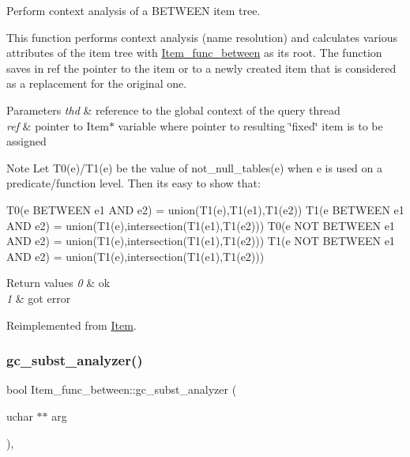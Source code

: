 Perform context analysis of a B\+E\+T\+W\+E\+EN item tree.

This function performs context analysis (name resolution) and calculates various attributes of the item tree with \mbox{\hyperlink{classItem__func__between}{Item\+\_\+func\+\_\+between}} as its root. The function saves in ref the pointer to the item or to a newly created item that is considered as a replacement for the original one.


\begin{DoxyParams}{Parameters}
{\em thd} & reference to the global context of the query thread \\
\hline
{\em ref} & pointer to Item$\ast$ variable where pointer to resulting \char`\"{}fixed\char`\"{} item is to be assigned\\
\hline
\end{DoxyParams}
\begin{DoxyNote}{Note}
Let T0(e)/T1(e) be the value of not\+\_\+null\+\_\+tables(e) when e is used on a predicate/function level. Then it\textquotesingle{}s easy to show that\+: \begin{DoxyVerb}    T0(e BETWEEN e1 AND e2)     = union(T1(e),T1(e1),T1(e2))
    T1(e BETWEEN e1 AND e2)     = union(T1(e),intersection(T1(e1),T1(e2)))
    T0(e NOT BETWEEN e1 AND e2) = union(T1(e),intersection(T1(e1),T1(e2)))
    T1(e NOT BETWEEN e1 AND e2) = union(T1(e),intersection(T1(e1),T1(e2)))\end{DoxyVerb}

\end{DoxyNote}

\begin{DoxyRetVals}{Return values}
{\em 0} & ok \\
\hline
{\em 1} & got error \\
\hline
\end{DoxyRetVals}


Reimplemented from \mbox{\hyperlink{classItem}{Item}}.

\mbox{\label{classItem__func__between_a3f2bb762cdae1a93c78425d5752b274f}} 
\subsubsection{\texorpdfstring{gc\+\_\+subst\+\_\+analyzer()}{gc\_subst\_analyzer()}}
{\footnotesize\ttfamily bool Item\+\_\+func\+\_\+between\+::gc\+\_\+subst\+\_\+analyzer (\begin{DoxyParamCaption}\item[{uchar $\ast$$\ast$}]{arg }\end{DoxyParamCaption})\hspace{0.3cm}{\ttfamily [inline]}, {\ttfamily [virtual]}}


